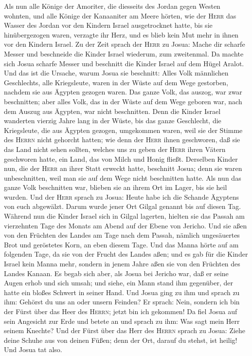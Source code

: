  Als nun alle Könige der Amoriter, die diesseits des
Jordan gegen Westen wohnten, und alle Könige der Kanaaniter am Meere
hörten, wie der \textsc{Herr} das Wasser des Jordan vor den Kindern
Israel ausgetrocknet hatte, bis sie hinübergezogen waren, verzagte ihr
Herz, und es blieb kein Mut mehr in ihnen vor den Kindern Israel.
 Zu der Zeit sprach der \textsc{Herr} zu Josua: Mache dir
scharfe Messer und beschneide die Kinder Israel wiederum, zum
zweitenmal.  Da machte sich Josua scharfe Messer und
beschnitt die Kinder Israel auf dem Hügel Aralot.  Und das
ist die Ursache, warum Josua sie beschnitt: Alles Volk männlichen
Geschlechts, alle Kriegsleute, waren in der Wüste auf dem Wege
gestorben, nachdem sie aus Ägypten gezogen waren.  Das
ganze Volk, das auszog, war zwar beschnitten; aber alles Volk, das in
der Wüste auf dem Wege geboren war, nach dem Auszug aus Ägypten, war
nicht beschnitten.  Denn die Kinder Israel wanderten
vierzig Jahre lang in der Wüste, bis das ganze Geschlecht, die
Kriegsleute, die aus Ägypten gezogen, umgekommen waren, weil sie der
Stimme des \textsc{Herrn} nicht gehorcht hatten; wie denn der
\textsc{Herr} ihnen geschworen, daß sie das Land nicht sehen sollten,
welches uns zu geben der \textsc{Herr} ihren Vätern geschworen hatte,
ein Land, das von Milch und Honig fließt.  Derselben
Kinder nun, die der \textsc{Herr} an ihrer Statt erweckt hatte,
beschnitt Josua; denn sie waren unbeschnitten, weil man sie auf dem Wege
nicht beschnitten hatte.  Als nun das ganze Volk
beschnitten war, blieben sie an ihrem Ort im Lager, bis sie heil wurden.
 Und der \textsc{Herr} sprach zu Josua: Heute habe ich die
Schande Ägyptens von euch abgewälzt. Darum wurde jener Ort Gilgal
genannt bis auf diesen Tag.  Während nun die Kinder
Israel sich in Gilgal lagerten, hielten sie das Passah am vierzehnten
Tage des Monats am Abend auf der Ebene von Jericho.  Und
sie aßen von den Früchten des Landes am Tage nach dem Passah, nämlich
ungesäuertes Brot und geröstetes Korn, an eben diesem Tage.
 Und das Manna hörte auf am folgenden Tage, da sie von
der Frucht des Landes aßen; und es gab für die Kinder Israel kein Manna
mehr, sondern in jenem Jahre aßen sie von den Früchten des Landes
Kanaan.  Es begab sich aber, als Josua bei Jericho war,
daß er seine Augen erhob und sich umsah; und siehe, ein Mann stand ihm
gegenüber, der hatte ein bloßes Schwert in seiner Hand. Und Josua ging
zu ihm und sprach zu ihm: Gehörst du uns an oder unsern Feinden?
 Er sprach: Nein, sondern ich bin der Fürst über das Heer
des \textsc{Herrn}; jetzt bin ich gekommen! Da fiel Josua auf sein
Angesicht zur Erde und betete an und sprach zu ihm: Was sagt mein Herr
seinem Knechte?  Und der Fürst über das Herr des
\textsc{Herrn} sprach zu Josua: Ziehe deine Schuhe aus von deinen Füßen;
denn der Ort, darauf du stehst, ist heilig! Und Josua tat also.

